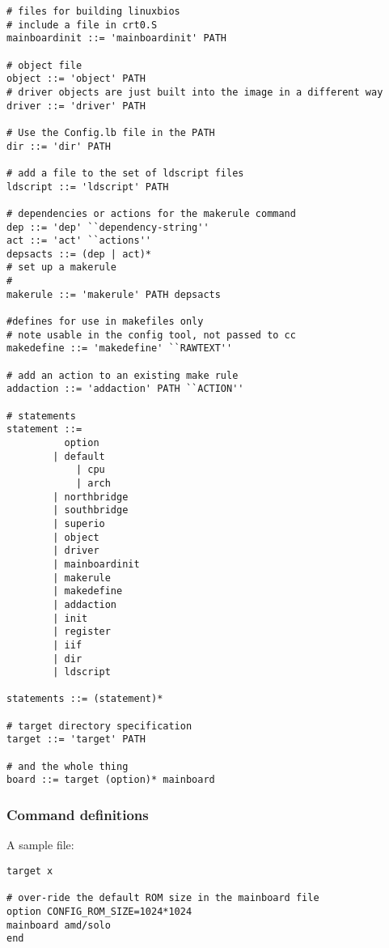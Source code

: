 \begin{verbatim}
# files for building linuxbios
# include a file in crt0.S
mainboardinit ::= 'mainboardinit' PATH

# object file
object ::= 'object' PATH
# driver objects are just built into the image in a different way
driver ::= 'driver' PATH

# Use the Config.lb file in the PATH
dir ::= 'dir' PATH

# add a file to the set of ldscript files
ldscript ::= 'ldscript' PATH

# dependencies or actions for the makerule command
dep ::= 'dep' ``dependency-string''
act ::= 'act' ``actions''
depsacts ::= (dep | act)*
# set up a makerule
#
makerule ::= 'makerule' PATH depsacts

#defines for use in makefiles only
# note usable in the config tool, not passed to cc
makedefine ::= 'makedefine' ``RAWTEXT''

# add an action to an existing make rule
addaction ::= 'addaction' PATH ``ACTION''

# statements
statement ::=
		  option
		| default
        	| cpu
        	| arch
		| northbridge
		| southbridge
		| superio
		| object
		| driver
		| mainboardinit
		| makerule
		| makedefine
		| addaction
		| init
		| register
		| iif
		| dir
		| ldscript

statements ::= (statement)*

# target directory specification
target ::= 'target' PATH

# and the whole thing
board ::= target (option)* mainboard

\end{verbatim}

\subsubsection{Command definitions}


A sample file:

\begin{verbatim}
target x

# over-ride the default ROM size in the mainboard file
option CONFIG_ROM_SIZE=1024*1024
mainboard amd/solo
end

\end{verbatim}

